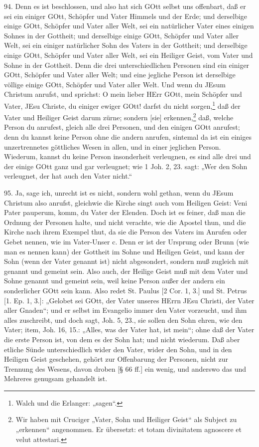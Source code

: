 94. Denn es ist beschlossen, und also hat sich GOtt selbst uns offenbart, daß er sei ein einiger GOtt, Schöpfer und Vater Himmels und der Erde; und derselbige einige GOtt, Schöpfer und Vater aller Welt, sei ein natürlicher Vater eines einigen Sohnes in der Gottheit; und derselbige einige GOtt, Schöpfer und Vater aller Welt, sei ein einiger natürlicher Sohn des Vaters in der Gottheit; und derselbige einige GOtt, Schöpfer und Vater aller Welt, sei ein Heiliger Geist, vom Vater und Sohne in der Gottheit. Denn die drei unterschiedlichen Personen sind ein einiger GOtt, Schöpfer und Vater aller Welt; und eine jegliche Person ist derselbige völlige einige GOtt, Schöpfer und Vater aller Welt. Und wenn du JEsum Christum anrufst, und sprichst: O mein lieber HErr GOtt, mein Schöpfer und Vater, JEsu Christe, du einiger ewiger GOtt! darfst du nicht sorgen,\footnote{Walch und die Erlanger: „sagen“.} daß der Vater und Heiliger Geist darum zürne; sondern [sie] erkennen,\footnote{Wir haben mit Cruciger „Vater, Sohn und Heiliger Geist“ als Subject zu „erkennen“ angenommen. Er übersetzt: et totam divinitatem agnoscere et velut attestari.} daß, welche Person du anrufest, gleich alle drei Personen, und den einigen GOtt anrufest; denn du kannst keine Person ohne die andern anrufen, sintemal da ist ein einiges unzertrennetes göttliches Wesen in allen, und in einer jeglichen Person. Wiederum, kannst du keine Person insonderheit verleugnen, es sind alle drei und der einige GOtt ganz und gar verleugnet; wie 1 Joh. 2, 23. sagt: „Wer den Sohn verleugnet, der hat auch den Vater nicht.“

95. Ja, sage ich, unrecht ist es nicht, sondern wohl gethan, wenn du JEsum Christum also anrufst, gleichwie die Kirche singt auch vom Heiligen Geist: Veni Pater pauperum, komm, du Vater der Elenden. Doch ist es feiner, daß man die Ordnung der Personen halte, und nicht verachte, wie die Apostel thun, und die Kirche nach ihrem Exempel thut, da sie die Person des Vaters im Anrufen oder Gebet nennen, wie im Vater-Unser c. Denn er ist der Ursprung oder Brunn (wie man es nennen kann) der Gottheit im Sohne und Heiligen Geist, und kann der Sohn (wenn der Vater genannt ist) nicht abgesondert, sondern muß zugleich mit genannt und gemeint sein. Also auch, der Heilige Geist muß mit dem Vater und Sohne genannt und gemeint sein, weil keine Person außer der andern ein sonderlicher GOtt sein kann. Also redet St. Paulus [2 Cor. 1, 3.] und St. Petrus [1. Ep. 1, 3.]: „Gelobet sei GOtt, der Vater unseres HErrn JEsu Christi, der Vater aller Gnaden“; und er selbst im Evangelio immer den Vater vorzeucht, und ihm alles zuschreibt, und doch sagt, Joh. 5, 23., sie sollen den Sohn ehren, wie den Vater; item, Joh. 16, 15.: „Alles, was der Vater hat, ist mein“; ohne daß der Vater die erste Person ist, von dem es der Sohn hat; und nicht wiederum. Daß aber etliche Sünde unterschiedlich wider den Vater, wider den Sohn, und in den Heiligen Geist geschehen, gehört zur Offenbarung der Personen, nicht zur Trennung des Wesens, davon droben [§ 66 ff.] ein wenig, und anderswo das und Mehreres genugsam gehandelt ist.

